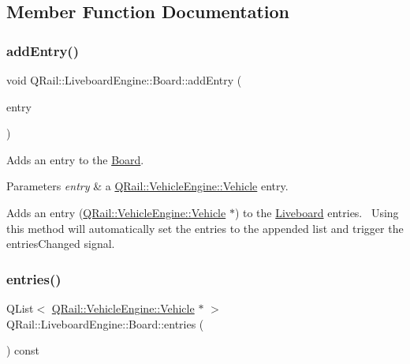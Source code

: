 \subsection{Member Function Documentation}
\mbox{\label{classQRail_1_1LiveboardEngine_1_1Board_ad79d5e4cd527fe02165f1231478b8f8b}} 
\subsubsection{\texorpdfstring{addEntry()}{addEntry()}}
{\footnotesize\ttfamily void Q\+Rail\+::\+Liveboard\+Engine\+::\+Board\+::add\+Entry (\begin{DoxyParamCaption}\item[{\mbox{\hyperlink{classQRail_1_1VehicleEngine_1_1Vehicle}{Q\+Rail\+::\+Vehicle\+Engine\+::\+Vehicle}} $\ast$}]{entry }\end{DoxyParamCaption})}



Adds an entry to the \mbox{\hyperlink{classQRail_1_1LiveboardEngine_1_1Board}{Board}}. 


\begin{DoxyParams}{Parameters}
{\em entry} & a \mbox{\hyperlink{classQRail_1_1VehicleEngine_1_1Vehicle}{Q\+Rail\+::\+Vehicle\+Engine\+::\+Vehicle}} entry.\\
\hline
\end{DoxyParams}
Adds an entry (\mbox{\hyperlink{classQRail_1_1VehicleEngine_1_1Vehicle}{Q\+Rail\+::\+Vehicle\+Engine\+::\+Vehicle}} $\ast$) to the \mbox{\hyperlink{namespaceLiveboard}{Liveboard}} entries.~\newline
 Using this method will automatically set the entries to the appended list and trigger the entries\+Changed signal. \mbox{\label{classQRail_1_1LiveboardEngine_1_1Board_afbba31f8d0f67e98f9bea58ebcf1e9ac}} 
\subsubsection{\texorpdfstring{entries()}{entries()}}
{\footnotesize\ttfamily Q\+List$<$ \mbox{\hyperlink{classQRail_1_1VehicleEngine_1_1Vehicle}{Q\+Rail\+::\+Vehicle\+Engine\+::\+Vehicle}} $\ast$ $>$ Q\+Rail\+::\+Liveboard\+Engine\+::\+Board\+::entries (\begin{DoxyParamCaption}{ }\end{DoxyParamCaption}) const}



